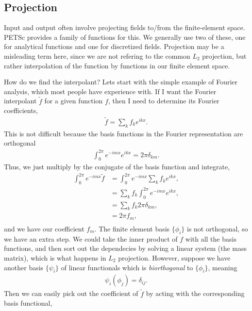 \subsection{Projection}

Input and output often involve projecting fields to/from the finite-element space. PETSc provides a family of functions
for this. We generally use two of these, one for analytical functions and one for discretized fields. Projection may be
a misleading term here, since we are not refering to the common $L_2$ projection, but rather interpolation of the
function by functions in our finite element space.

How do we find the interpolant? Lets start with the simple example of Fourier analysis, which most people have
experience with. If I want the Fourier interpolant $\tilde f$ for a given function $f$, then I need to determine its
Fourier coefficients,
\begin{align}
  \tilde f = \sum_k f_k e^{i k x}.
\end{align}
This is not difficult because the basis functions in the Fourier representation are orthogonal
\begin{align}
  \int^{2\pi}_0 e^{-i m x} e^{i k x} = 2\pi \delta_{km}.
\end{align}
Thus, we just multiply by the conjugate of the basis function and integrate,
\begin{align}
  \int^{2\pi}_0 e^{-i m x} \tilde f &= \int^{2\pi}_0 e^{-i m x} \sum_k f_k e^{i k x}, \\
                                  &= \sum_k f_k \int^{2\pi}_0 e^{-i m x} e^{i k x}, \\
                                  &= \sum_k f_k 2\pi \delta_{km}, \\
                                  &= 2\pi f_m, \\
\end{align}
and we have our coefficient $f_m$. The finite element basis $\{\phi_i\}$ is not orthogonal, so we have an extra step. We
could take the inner product of $f$ with all the basis functions, and then sort out the dependecies by solving a linear
system (the mass matrix), which is what happens in $L_2$ projection. However, suppose we have another basis $\{\psi_i\}$
of linear functionals which is \textit{biorthogonal} to $\{\phi_i\}$, meaning
\begin{align}
  \psi_i(\phi_j) = \delta_{ij}.
\end{align}
Then we can easily pick out the coefficient of $\tilde f$ by acting with the corresponding basis functional,
